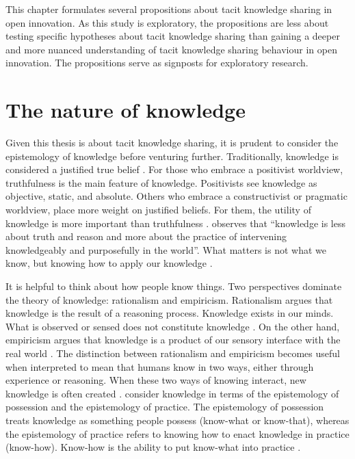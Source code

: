 This chapter formulates several propositions about tacit knowledge sharing in open innovation. As this study is exploratory, the propositions are less about testing specific hypotheses about tacit knowledge sharing than gaining a deeper and more nuanced understanding of tacit knowledge sharing behaviour in open innovation. The propositions serve as signposts for exploratory research.

\section{The nature of knowledge}

Given this thesis is about tacit knowledge sharing, it is prudent to consider the epistemology of knowledge before venturing further. Traditionally, knowledge is considered a justified true belief \citep{bolisani2018elusive}. For those who embrace a positivist worldview, truthfulness is the main feature of knowledge. Positivists see knowledge as objective, static, and absolute. Others who embrace a constructivist or pragmatic worldview, place more weight on justified beliefs. For them, the utility of knowledge is more important than truthfulness \citep{bolisani2018elusive}. \citet{spender1996organizational} observes that \enquote{knowledge is less about truth and reason and more about the practice of intervening knowledgeably and purposefully in the world}. What matters is not what we know, but knowing how to apply our knowledge \citep{ryle1949concept,orlikowski2002knowing}. \medskip

It is helpful to think about how people know things. Two perspectives dominate the theory of knowledge: rationalism and empiricism. Rationalism argues that knowledge is the result of a reasoning process. Knowledge exists in our minds. What is observed or sensed does not constitute knowledge \citep{russell2009human}. On the other hand, empiricism argues that knowledge is a product of our sensory interface with the real world \citep{bolisani2018elusive}. The distinction between rationalism and empiricism becomes useful when interpreted to mean that humans know in two ways, either through experience or reasoning. When these two ways of knowing interact, new knowledge is often created \citep{spender1996making,bolisani2018elusive}. \citet{cook1999bridging} consider knowledge in terms of the epistemology of possession and the epistemology of practice. The epistemology of possession treats knowledge as something people possess (know-what or know-that), whereas the epistemology of practice refers to knowing how to enact knowledge in practice (know-how). Know-how is the ability to put know-what into practice \citep{cook1999bridging,tsoukas2001organizational, marabelli2014knowing}. \medskip

